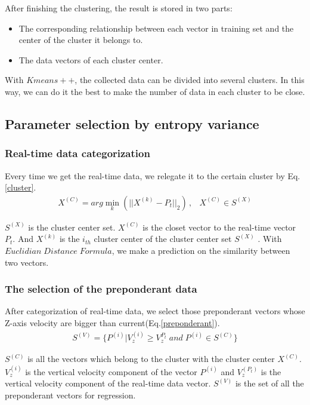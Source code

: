 After finishing the clustering, the result is stored in two parts:

\begin{itemize}
	\item The corresponding relationship between each vector in training set and the center of the cluster it belongs to.
	\item The data vectors of each cluster center.
\end{itemize}

With $Kmeans++$, the collected data can be divided into several clusters. In this way, we can do it the best to make the number of data in each cluster to be close.

\subsection{Parameter selection by entropy variance}

\subsubsection{Real-time data categorization}

Every time we get the real-time data, we relegate it to the certain cluster by Eq.\ref{cluster}.
\begin{eqnarray}\label{cluster}
X^{(C)}=arg\min \limits_{k}{(||X^{(k)}-P_{t}||_{2})} \, ,&X^{(C)}\in S^{(X)}
\end{eqnarray}

$S^{(X)}$ is the cluster center set. $X^{(C)}$ is the closet vector to the real-time vector $P_t$. And $X^{(k)}$ is the $i_{th}$ cluster center of the cluster center set $S^{(X)}$ . With $Euclidian \; Distance \; Formula$, we make a prediction on the similarity between two vectors.

\subsubsection{The selection of the preponderant data}

After categorization of real-time data, we select those preponderant vectors whose Z-axis velocity are bigger than current(Eq.\ref{preponderant}).
\begin{eqnarray}\label{preponderant}
S^{(V)}=\{P^{(i)}|V_{z}^{(i)}\geq V_{z}^{P_{t}} \; and \; P^{(i)}\in S^{(C)}\}
\end{eqnarray}

$S^{(C)}$ is all the vectors which belong to the cluster with the cluster center $X^{(C)}$. $V_{z}^{(i)}$ is the vertical velocity component of the vector $P^{(i)}$ and $V_{z}^{(P_{t})}$ is the vertical velocity component of the real-time data vector. $S^{(V)}$ is the set of all the preponderant vectors for regression.


